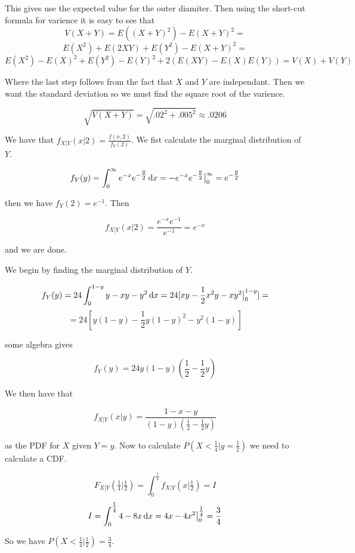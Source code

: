 \documentclass[11pt,largemargins]{homework}
\begin{document}
This gives use the expected value for the outer diamiter. Then using the short-cut formula for varience it is easy to see that 
\[V(X+Y) = E((X+Y)^2) -E(X + Y)^2 = \] 
\[E(X^2)+E(2XY)+E(Y^2) - E(X+Y)^2 = \]
\[E(X^2) - E(X)^2 + E(Y^2) - E(Y)^2 +2\left(E(XY) - E(X)E(Y)\right)= V(X)+V(Y) \]

Where the last step follows from the fact that $X$ and $Y$ are independant.  
Then we want the standard deviation so we must find the square root of the varience. 

\[\sqrt{V(X + Y)} = \sqrt{.02^2 + .005^2 }  \approx .0206 \] 

\newpage
\question
We have that $f_{X|Y}(x|2) = \frac{f(x, 2)}{f_Y(2)}$. We fist calculate the marginal distribution of $Y$. 

\[f_Y(y) = \int_0^\infty e^{-x}e^{-\tfrac{y}{2}} \dif x = -e^{-x}e^{-\tfrac{y}{2}}\big|_0^\infty = e^{-\tfrac{y}{2}}\]

then we have $f_Y(2) = e^{-1}$. Then 

\[f_{X|Y}(x|2) = \frac{e^{-x}e^{-1}}{e^{-1}} = e^{-x}\]

and we are done. 

\newpage
\question 
We begin by finding the marginal distribution of $Y$. 

\[f_Y(y) = 24 \int_0^{1 - y} y - xy -y^2 \dif x = 24[xy - \frac{1}{2}x^2y - xy^2 \big|_0^{1-y}] = \]
\[= 24[y(1 - y) - \frac{1}{2}y(1 - y)^2 - y^2(1 - y)]\]

some algebra gives 

\[f_Y(y) = 24y(1 - y)(\frac{1}{2} - \frac{1}{2}y) \] 

We then have that 

\[ f_{X|Y}(x|y) = \frac{1 - x - y}{(1 - y)(\tfrac{1}{2} - \tfrac{1}{2}y)} \]

as the PDF for $X$ given $Y = y$. Now to calculate $P(X < \frac{1}{4} | y = \frac{1}{2})$ we need to calculate 
a CDF. 

\[F_{X|Y}(\tfrac{1}{4}|\tfrac{1}{2}) = \int_0^{\tfrac{1}{4}} f_{X|Y}(x|\tfrac{1}{2}) = I\]
\[I = \int_0^{\tfrac{1}{4}} 4 - 8x \dif x = 4x - 4x^2 \big|_0^{\tfrac{1}{4}} = \frac{3}{4}\]

So we have $P(X < \tfrac{1}{4}|\tfrac{1}{2}) = \frac{3}{4}$. 
\end{document}
